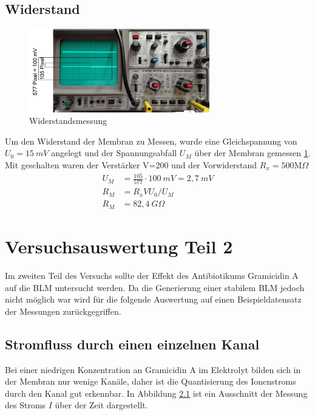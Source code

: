 \documentclass{include/thesisclass3}
\begin{document}
\section{Widerstand}
\begin{figure}[ht]
	\begin{center}
		\includegraphics[width=0.7\textwidth]{images/Widerstand.png}
		\caption{Widerstandsmessung}
		\label{resistance}
	\end{center}
\end{figure}
Um den Widerstand der Membran zu Messen, wurde eine Gleichspannung von $U_0=15~\si{mV}$ angelegt und der Spannungsabfall $U_M$ über der Membran gemessen \ref{resistance}. Mit geschalten waren der Verstärker V=200 und der Vorwiderstand $R_x=500\text{M}\Omega$
\begin{align*}
	U_M&=\frac{105}{577}\cdot 100~\si{mV}= 2,7 ~\si{mV}\\
	R_M&=R_x V U_0/U_M\\
	R_M&=82,4~\si{G\Omega}
\end{align*}

\chapter{Versuchsauswertung Teil 2}
Im zweiten Teil des Versuchs sollte der Effekt des Antibiotikums Gramicidin A auf die BLM untersucht werden. Da die Generierung einer stabilem BLM jedoch nicht möglich war wird für die folgende Auswertung auf einen Beispieldatensatz der Messungen zurückgegriffen.

\section{Stromfluss durch einen einzelnen Kanal}
Bei einer niedrigen Konzentration an Gramicidin A im Elektrolyt bilden sich in der Membran nur wenige Kanäle, daher ist die Quantisierung des Ionenstroms durch den Kanal gut erkennbar. In Abbildung \ref{singlechannel} ist ein Ausschnitt der Messung des Stroms $I$ über der Zeit dargestellt.
\begin{figure}[H]
\caption{}
\label{singlechannel}
\end{figure}
\end{document}

